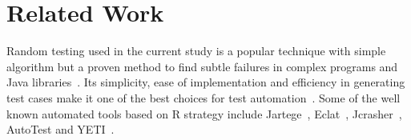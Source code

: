 \documentclass[conference]{IEEEtran}
\begin{document}










\section{Related Work}\label{sec:rw}

Random testing used in the current study is a popular technique with simple algorithm but a proven method to find subtle failures in complex programs and Java libraries~\cite{Pacheco2005, Csallner2004}. Its simplicity, ease of implementation and efficiency in generating test cases make it one of the best choices for test automation~\cite{Hamlet1994}. Some of the well known automated tools based on R strategy include Jartege~\cite{Oriat2004}, Eclat~\cite{Pacheco2005}, Jcrasher~\cite{Csallner2004}, AutoTest \cite{Leitner2007} and YETI~\cite{Oriol2012}.

\end{document}
